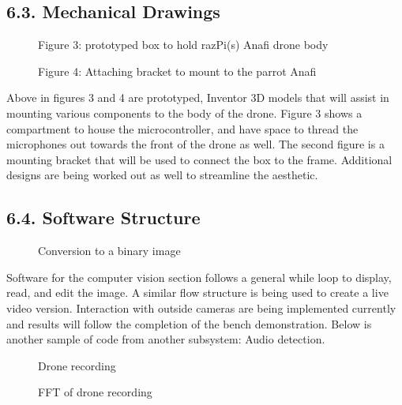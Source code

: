 \documentclass[10pt]{article}
\begin{document}
\subsection{6.3. Mechanical Drawings}
\begin{figure}
\caption{Figure 3: prototyped box to hold razPi(s) Anafi drone body}
\label{fig:3}
\end{figure}
\begin{figure}
\caption{Figure 4: Attaching bracket to mount to the parrot Anafi}
\label{fig:4}
\end{figure}
Above in figures 3 and 4 are prototyped, Inventor 3D models that will assist in mounting various components to the body of the drone. Figure 3 shows a compartment to house the microcontroller, and have space to thread the microphones out towards the front of the drone as well. The second figure is a mounting bracket that will be used to connect the box to the frame. Additional designs are being worked out as well to streamline the aesthetic. 

\subsection{6.4. Software Structure}
\begin{figure}
\caption{Conversion to a binary image}
\label{fig:3456}
\end{figure}

%
Software for the computer vision section follows a general while loop to display, read, and edit the image. A similar flow structure is being used to create a live video version. Interaction with outside cameras are being implemented currently and results will follow the completion of the bench demonstration. Below is another sample of code from another subsystem: Audio detection. 
%
\begin{figure}
\caption{Drone recording}
\label{fig:drone-recording}
\end{figure}
\begin{figure}
\caption{FFT of drone recording}
\label{fig:fft-drone-recording}
\end{figure}
\end{document}
